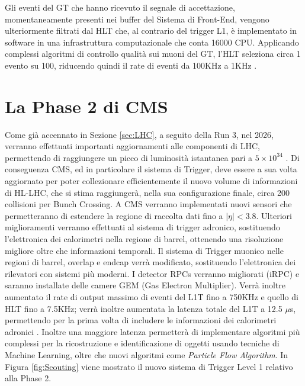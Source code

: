 Gli eventi del GT che hanno ricevuto il segnale di accettazione, momentaneamente presenti nei buffer del Sistema di Front-End, vengono ulteriormente filtrati dal HLT che, al contrario del trigger L1, è implementato in software in una infrastruttura computazionale che conta 16000 CPU. \newline
Applicando complessi algoritmi di controllo qualità sui muoni del GT, l'HLT seleziona circa 1 evento su 100, riducendo quindi il rate di eventi da 100KHz a 1KHz \cite{MasterThesisNicLai}.


\section{La Phase 2 di CMS}
\label{sec:Phase2}

Come già accennato in Sezione \ref{sec:LHC}, a seguito della Run 3, nel 2026, verranno effettuati importanti aggiornamenti alle componenti di LHC, permettendo di raggiungere un picco di luminosità istantanea pari a $5 \times 10^{34}$ \Lumi. Di conseguenza CMS, ed in particolare il sistema di Trigger, deve essere a sua volta aggiornato per poter collezionare efficientemente il nuovo volume di informazioni di HL-LHC, che si stima raggiungerà, nella sua configurazione finale, circa 200 collisioni per Bunch Crossing. A CMS verranno implementati nuovi sensori che permetteranno di estendere la regione di raccolta dati fino a $|\eta| < 3.8$. Ulteriori miglioramenti verranno effettuati al sistema di trigger adronico, sostituendo l'elettronica dei calorimetri nella regione di barrel, ottenendo una risoluzione migliore oltre che informazioni temporali. \newline
Il sistema di Trigger muonico nelle regioni di barrel, overlap e endcap verrà modificato, sostituendo l'elettronica dei rilevatori con sistemi più moderni. I detector RPCs verranno migliorati (iRPC) e saranno installate delle camere GEM (Gas Electron Multiplier). \newline
Verrà inoltre aumentato il rate di output massimo di eventi del L1T fino a 750KHz e quello di HLT fino a 7.5KHz; verrà inoltre aumentata la latenza totale del L1T a 12.5 $\mu$s, permettendo per la prima volta di includere le informazioni dei calorimetri adronici \cite{collaboration2021phase}. Inoltre una maggiore latenza permetterà di implementare algoritmi più complessi per la ricostruzione e identificazione di oggetti usando tecniche di Machine Learning, oltre che nuovi algoritmi come \textit{Particle Flow Algorithm}. In Figura \ref{fig:Scouting} viene mostrato il nuovo sistema di Trigger Level 1 relativo alla Phase 2.


